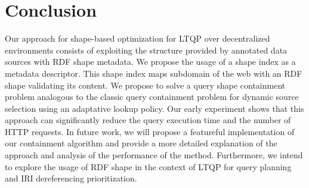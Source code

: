 \section{Conclusion}
Our approach for shape-based optimization for LTQP over decentralized environments consists of exploiting the structure provided by
annotated data sources with RDF shape metadata. 
We propose the usage of a shape index as a metadata descriptor.
This shape index maps subdomain of the web with an RDF shape validating its content.
We propose to solve a query shape containment problem analogous to the classic query containment problem for dynamic source selection
using an adaptative lookup policy. 
Our early experiment shows that this approach can significantly reduce the query execution time and the number of HTTP requests.
In future work, we will propose a featureful implementation of our containment algorithm and provide a more
detailed explanation of the approach and analysis of the performance of the method.
Furthermore, we intend to explore the usage of RDF shape in the context of LTQP for query planning and IRI dereferencing prioritization.